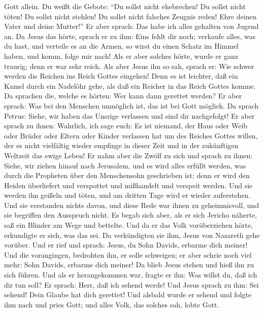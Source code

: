 Gott allein.  Du weißt die Gebote: ``Du sollst nicht
ehebrechen! Du sollst nicht töten! Du sollst nicht stehlen! Du sollst
nicht falsches Zeugnis reden! Ehre deinen Vater und deine Mutter!''
 Er aber sprach: Das habe ich alles gehalten von Jugend
an.  Da Jesus das hörte, sprach er zu ihm: Eins fehlt dir
noch; verkaufe alles, was du hast, und verteile es an die Armen, so
wirst du einen Schatz im Himmel haben, und komm, folge mir nach!
 Als er aber solches hörte, wurde er ganz traurig; denn
er war sehr reich.  Als aber Jesus ihn so sah, sprach er:
Wie schwer werden die Reichen ins Reich Gottes eingehen! 
Denn es ist leichter, daß ein Kamel durch ein Nadelöhr gehe, als daß ein
Reicher in das Reich Gottes komme.  Da sprachen die,
welche es hörten: Wer kann dann gerettet werden?  Er aber
sprach: Was bei den Menschen unmöglich ist, das ist bei Gott möglich.
 Da sprach Petrus: Siehe, wir haben das Unsrige verlassen
und sind dir nachgefolgt!  Er aber sprach zu ihnen:
Wahrlich, ich sage euch: Es ist niemand, der Haus oder Weib oder Brüder
oder Eltern oder Kinder verlassen hat um des Reiches Gottes willen,
 der es nicht vielfältig wieder empfinge in dieser Zeit
und in der zukünftigen Weltzeit das ewige Leben!  Er nahm
aber die Zwölf zu sich und sprach zu ihnen: Siehe, wir ziehen hinauf
nach Jerusalem, und es wird alles erfüllt werden, was durch die
Propheten über den Menschensohn geschrieben ist;  denn er
wird den Heiden überliefert und verspottet und mißhandelt und verspeit
werden.  Und sie werden ihn geißeln und töten, und am
dritten Tage wird er wieder auferstehen.  Und sie
verstanden nichts davon, und diese Rede war ihnen zu geheimnisvoll, und
sie begriffen den Ausspruch nicht.  Es begab sich aber,
als er sich Jericho näherte, saß ein Blinder am Wege und bettelte.
 Und da er das Volk vorüberziehen hörte, erkundigte er
sich, was das sei.  Da verkündigten sie ihm, Jesus von
Nazareth gehe vorüber.  Und er rief und sprach: Jesus, du
Sohn Davids, erbarme dich meiner!  Und die vorangingen,
bedrohten ihn, er solle schweigen; er aber schrie noch viel mehr: Sohn
Davids, erbarme dich meiner!  Da blieb Jesus stehen und
hieß ihn zu sich führen. Und als er herangekommen war, fragte er ihn:
 Was willst du, daß ich dir tun soll? Er sprach: Herr,
daß ich sehend werde!  Und Jesus sprach zu ihm: Sei
sehend! Dein Glaube hat dich gerettet!  Und alsbald wurde
er sehend und folgte ihm nach und pries Gott; und alles Volk, das
solches sah, lobte Gott.


